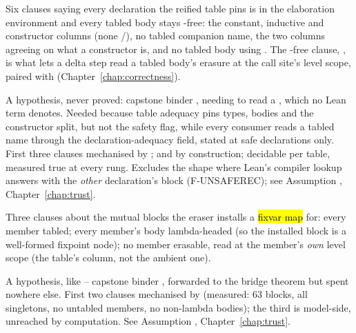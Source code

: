 \begin{definition}
\label{def:TableSafe}
\leanok
{}
\stAssumed{}  Six clauses saying every declaration the reified table pins is
\hl{} in the elaboration environment and every tabled body stays -free: the
constant, inductive and constructor columns (none /), no tabled
 companion name, the two columns agreeing on what a constructor is, and no
tabled body using .
 The -free clause, , is what lets a delta step read a tabled
body's erasure at the call site's level scope, paired with 
(Chapter~\ref{chap:correctness}).
\end{definition}

\begin{remark}
\stAssumed{}  A hypothesis, never proved: capstone binder , needing to
read a , which no Lean term denotes. Needed because table adequacy pins
types, bodies and the constructor split, but not the safety flag, while every consumer reads a
tabled name through the declaration-adequacy field, stated at safe declarations only. First three
clauses mechanised by ;  and  by
construction;  decidable per table, measured true at every rung. Excludes the
 shape where Lean's compiler lookup answers with the \emph{other}
declaration's block (F-UNSAFEREC); see Assumption , Chapter~\ref{chap:trust}.
\end{remark}

\begin{definition}
\label{def:TableBlocks}
\leanok
{}
\stAssumed{}  Three clauses about the mutual blocks the eraser installs a
\hl{fixvar map} for: every member tabled; every member's body lambda-headed (so the installed
block is a well-formed fixpoint node); no member erasable, read at the member's \emph{own} level
scope (the table's  column, not the ambient one).
\end{definition}

\begin{remark}
\stAssumed{}  A hypothesis, like  -- capstone binder ,
forwarded to the bridge theorem but spent nowhere else. First two clauses mechanised by
 (measured: 63 blocks, all singletons, no untabled members, no
non-lambda bodies); the third is model-side, unreached by computation. See Assumption
, Chapter~\ref{chap:trust}.
\end{remark}

